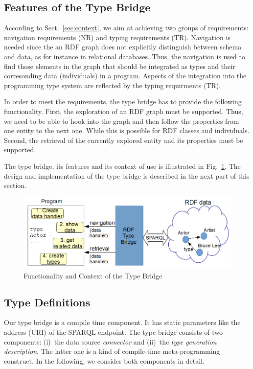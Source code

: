 \documentclass{llncs} %
\begin{document}
\subsection{Features of the Type Bridge}
  
According to Sect.~\ref{sec:context}, we aim at achieving two groups of requirements:
navigation requirements (NR) and typing requirements (TR). Navigation is needed since the an RDF graph does not explicitly 
distinguish between schema and data, as for instance in relational databases. Thus, the navigation is
used to find those elements in the graph that should be integrated as types and their corresonding data (individuals) in a program.
Aspects of the integration into the programming type system are reflected by the typing requirments (TR).

In order to meet the requirements, the type bridge has to provide the following functionality.
First, the exploration of an RDF graph must be supported. Thus, we need to be able to hook into the graph and then
follow the properties from one entity to the next one. While this is possible for RDF classes and individuals.
Second, the retrieval of the currently explored entity and its properties must be supported.

The type bridge, its features and its context of use is illustrated in Fig.~\ref{fig:context}.
The design and implementation of the type bridge is described in the next part of this section.

\begin{figure}
	\centering
		\includegraphics[width=0.98\linewidth]{./figs/context.png}
	\caption{Functionality and Context of the Type Bridge}
	\label{fig:context}
\end{figure}



\subsection{Type Definitions}

Our type bridge is a compile time component. It has static parameters like
the address (URI) of the SPARQL endpoint.
The type bridge consists of two components: (i)~the data source \emph{connector} and (ii)~the
\emph{type generation description}. The latter one is a kind of compile-time meta-programming construct.
In the following, we consider both components in detail.
\end{document}
